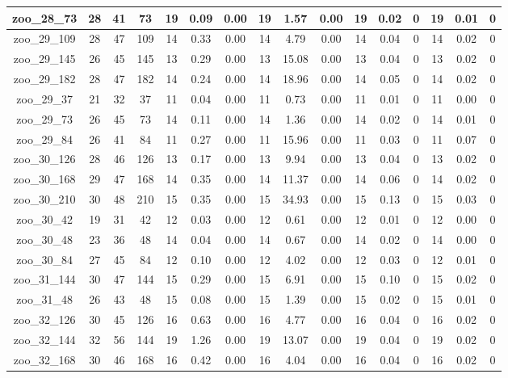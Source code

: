 \begin{landscape}
\begin{longtable}{|c|c|c|c|c|c|c|c|c|c|c|c|c|c|c|c|}
zoo\_28\_73 & 28 & 41 & 73 & 19 & 0.09 & 0.00 & 19 & 1.57 & 0.00 & 19 & 0.02 & 0 & 19 & 0.01 & 0 \\ \hline 
zoo\_29\_109 & 28 & 47 & 109 & 14 & 0.33 & 0.00 & 14 & 4.79 & 0.00 & 14 & 0.04 & 0 & 14 & 0.02 & 0 \\ \hline 
zoo\_29\_145 & 26 & 45 & 145 & 13 & 0.29 & 0.00 & 13 & 15.08 & 0.00 & 13 & 0.04 & 0 & 13 & 0.02 & 0 \\ \hline 
zoo\_29\_182 & 28 & 47 & 182 & 14 & 0.24 & 0.00 & 14 & 18.96 & 0.00 & 14 & 0.05 & 0 & 14 & 0.02 & 0 \\ \hline 
zoo\_29\_37 & 21 & 32 & 37 & 11 & 0.04 & 0.00 & 11 & 0.73 & 0.00 & 11 & 0.01 & 0 & 11 & 0.00 & 0 \\ \hline 
zoo\_29\_73 & 26 & 45 & 73 & 14 & 0.11 & 0.00 & 14 & 1.36 & 0.00 & 14 & 0.02 & 0 & 14 & 0.01 & 0 \\ \hline 
zoo\_29\_84 & 26 & 41 & 84 & 11 & 0.27 & 0.00 & 11 & 15.96 & 0.00 & 11 & 0.03 & 0 & 11 & 0.07 & 0 \\ \hline 
zoo\_30\_126 & 28 & 46 & 126 & 13 & 0.17 & 0.00 & 13 & 9.94 & 0.00 & 13 & 0.04 & 0 & 13 & 0.02 & 0 \\ \hline 
zoo\_30\_168 & 29 & 47 & 168 & 14 & 0.35 & 0.00 & 14 & 11.37 & 0.00 & 14 & 0.06 & 0 & 14 & 0.02 & 0 \\ \hline 
zoo\_30\_210 & 30 & 48 & 210 & 15 & 0.35 & 0.00 & 15 & 34.93 & 0.00 & 15 & 0.13 & 0 & 15 & 0.03 & 0 \\ \hline 
zoo\_30\_42 & 19 & 31 & 42 & 12 & 0.03 & 0.00 & 12 & 0.61 & 0.00 & 12 & 0.01 & 0 & 12 & 0.00 & 0 \\ \hline 
zoo\_30\_48 & 23 & 36 & 48 & 14 & 0.04 & 0.00 & 14 & 0.67 & 0.00 & 14 & 0.02 & 0 & 14 & 0.00 & 0 \\ \hline 
zoo\_30\_84 & 27 & 45 & 84 & 12 & 0.10 & 0.00 & 12 & 4.02 & 0.00 & 12 & 0.03 & 0 & 12 & 0.01 & 0 \\ \hline 
zoo\_31\_144 & 30 & 47 & 144 & 15 & 0.29 & 0.00 & 15 & 6.91 & 0.00 & 15 & 0.10 & 0 & 15 & 0.02 & 0 \\ \hline 
zoo\_31\_48 & 26 & 43 & 48 & 15 & 0.08 & 0.00 & 15 & 1.39 & 0.00 & 15 & 0.02 & 0 & 15 & 0.01 & 0 \\ \hline 
zoo\_32\_126 & 30 & 45 & 126 & 16 & 0.63 & 0.00 & 16 & 4.77 & 0.00 & 16 & 0.04 & 0 & 16 & 0.02 & 0 \\ \hline 
zoo\_32\_144 & 32 & 56 & 144 & 19 & 1.26 & 0.00 & 19 & 13.07 & 0.00 & 19 & 0.04 & 0 & 19 & 0.02 & 0 \\ \hline 
zoo\_32\_168 & 30 & 46 & 168 & 16 & 0.42 & 0.00 & 16 & 4.04 & 0.00 & 16 & 0.04 & 0 & 16 & 0.02 & 0 \\ \hline 

\end{longtable}
\end{landscape}
